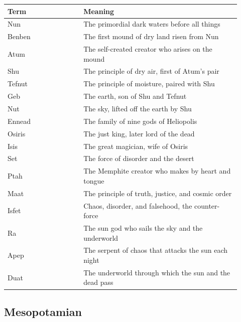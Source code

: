 \begin{longtable}{L{0.30\linewidth} L{0.62\linewidth}}
\toprule
\textbf{Term} & \textbf{Meaning} \\
\midrule
\endhead
Nun & The primordial dark waters before all things \\
Benben & The first mound of dry land risen from Nun \\
Atum & The self-created creator who arises on the mound \\
Shu & The principle of dry air, first of Atum's pair \\
Tefnut & The principle of moisture, paired with Shu \\
Geb & The earth, son of Shu and Tefnut \\
Nut & The sky, lifted off the earth by Shu \\
Ennead & The family of nine gods of Heliopolis \\
Osiris & The just king, later lord of the dead \\
Isis & The great magician, wife of Osiris \\
Set & The force of disorder and the desert \\
Ptah & The Memphite creator who makes by heart and tongue \\
Maat & The principle of truth, justice, and cosmic order \\
Isfet & Chaos, disorder, and falsehood, the counter-force \\
Ra & The sun god who sails the sky and the underworld \\
Apep & The serpent of chaos that attacks the sun each night \\
Duat & The underworld through which the sun and the dead pass \\
\bottomrule
\end{longtable}

\subsection{Mesopotamian}

